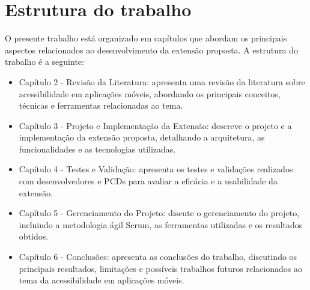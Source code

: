 \section{Estrutura do trabalho}

O presente trabalho está organizado em capítulos que abordam os principais aspectos relacionados ao desenvolvimento da extensão proposta. A estrutura do trabalho é a seguinte:

\begin{itemize}
	\item Capítulo 2 - Revisão da Literatura: apresenta uma revisão da literatura sobre acessibilidade em aplicações móveis, abordando os principais conceitos, técnicas e ferramentas relacionadas ao tema.
	\item Capítulo 3 - Projeto e Implementação da Extensão: descreve o projeto e a implementação da extensão proposta, detalhando a arquitetura, as funcionalidades e as tecnologias utilizadas.
	\item Capítulo 4 - Testes e Validação: apresenta os testes e validações realizados com desenvolvedores e PCDs para avaliar a eficácia e a usabilidade da extensão.
	\item Capítulo 5 - Gerenciamento do Projeto: discute o gerenciamento do projeto, incluindo a metodologia ágil Scrum, as ferramentas utilizadas e os resultados obtidos.
	\item Capítulo 6 - Conclusões: apresenta as conclusões do trabalho, discutindo os principais resultados, limitações e possíveis trabalhos futuros relacionados ao tema da acessibilidade em aplicações móveis.
\end{itemize}